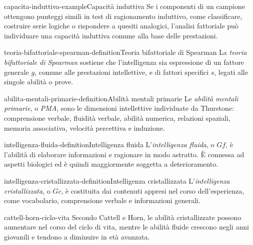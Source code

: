 \documentclass[preview]{standalone}
\begin{document}
\begin{snippetexample}{capacita-induttiva-example}{Capacità induttiva}
    Se i componenti di un campione ottengono punteggi simili in test di
    ragionamento induttivo, come classificare, costruire serie logiche o
    rispondere a quesiti analogici, l'analisi fattoriale può individuare una
    capacità induttiva comune alla base delle prestazioni.
\end{snippetexample}


\begin{snippetdefinition}{teoria-bifattoriale-spearman-definition}{Teoria bifattoriale di Spearman}
    La \emph{teoria bifattoriale di Spearman} sostiene che l'intelligenza sia
    espressione di un fattore generale \(g\), comune alle prestazioni
    intellettive, e di fattori specifici \(s\), legati alle singole abilità o
    prove.
\end{snippetdefinition}

\begin{snippetdefinition}{abilita-mentali-primarie-definition}{Abilità mentali primarie}
    Le \emph{abilità mentali primarie}, o \emph{PMA}, sono le dimensioni
    intellettive individuate da Thurstone: comprensione verbale, fluidità
    verbale, abilità numerica, relazioni spaziali, memoria associativa, velocità
    percettiva e induzione.
\end{snippetdefinition}

\begin{snippetdefinition}{intelligenza-fluida-definition}{Intelligenza fluida}
    L'\emph{intelligenza fluida}, o \(Gf\), è l'abilità di elaborare
    informazioni e ragionare in modo astratto. È connessa ad aspetti biologici
    ed è quindi maggiormente soggetta a deterioramento.
\end{snippetdefinition}

\begin{snippetdefinition}{intelligenza-cristallizzata-definition}{Intelligenza cristallizzata}
    L'\emph{intelligenza cristallizzata}, o \(Gc\), è costituita dai contenuti
    appresi nel corso dell'esperienza, come vocabolario, comprensione verbale e
    informazioni generali.
\end{snippetdefinition}

\begin{snippet}{cattell-horn-ciclo-vita}
    Secondo Cattell e Horn, le abilità cristallizzate possono aumentare nel
    corso del ciclo di vita, mentre le abilità fluide crescono negli anni
    giovanili e tendono a diminuire in età avanzata.
\end{snippet}
\end{document}
